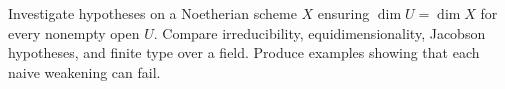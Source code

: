 \begin{problem}\label{chall:vi30-01}
Investigate hypotheses on a Noetherian scheme $X$ ensuring $\dim U=\dim X$ for every nonempty open $U$. Compare irreducibility, equidimensionality, Jacobson hypotheses, and finite type over a field. Produce examples showing that each naive weakening can fail.
\end{problem}
